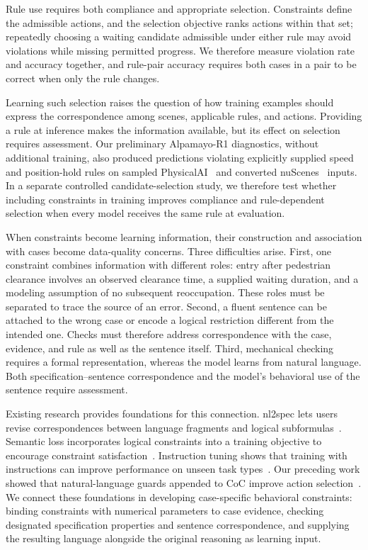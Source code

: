 Rule use requires both compliance and appropriate selection. Constraints
define the admissible actions, and the selection objective ranks actions
within that set; repeatedly choosing a waiting candidate admissible under
either rule may avoid violations while missing permitted progress. We
therefore measure violation rate and accuracy together, and rule-pair accuracy
requires both cases in a pair to be correct when only the rule changes.

Learning such selection raises the question of how training examples should
express the correspondence among scenes, applicable rules, and actions.
Providing a rule at inference makes the information available, but its effect
on selection requires assessment. Our preliminary Alpamayo-R1 diagnostics,
without additional training, also produced predictions violating explicitly
supplied speed and position-hold rules on sampled
PhysicalAI~\cite{nvidia2025physicalai} and converted
nuScenes~\cite{caesar2020nuscenes} inputs. In a separate controlled
candidate-selection study, we therefore test whether including constraints in
training improves compliance and rule-dependent selection when every model
receives the same rule at evaluation.

When constraints become learning information, their construction and
association with cases become data-quality concerns. Three difficulties arise.
First, one constraint combines information with different roles: entry after
pedestrian clearance involves an observed clearance time, a supplied waiting
duration, and a modeling assumption of no subsequent reoccupation. These roles
must be separated to trace the source of an error. Second, a fluent sentence
can be attached to the wrong case or encode a logical restriction different
from the intended one. Checks must therefore address correspondence with the
case, evidence, and rule as well as the sentence itself. Third, mechanical
checking requires a formal representation, whereas the model learns from
natural language. Both specification--sentence correspondence and the model's
behavioral use of the sentence require assessment.

Existing research provides foundations for this connection. nl2spec lets
users revise correspondences between language fragments and logical
subformulas~\cite{r9}. Semantic loss incorporates logical constraints into a
training objective to encourage constraint satisfaction~\cite{Xu2018}.
Instruction tuning shows that training with instructions can improve
performance on unseen task types~\cite{Wei2022}. Our preceding work showed
that natural-language guards appended to CoC improve action
selection~\cite{r4}. We connect these foundations in developing case-specific
behavioral constraints: binding constraints with numerical parameters to case
evidence, checking designated specification properties and sentence
correspondence, and supplying the resulting language alongside the original
reasoning as learning input.

